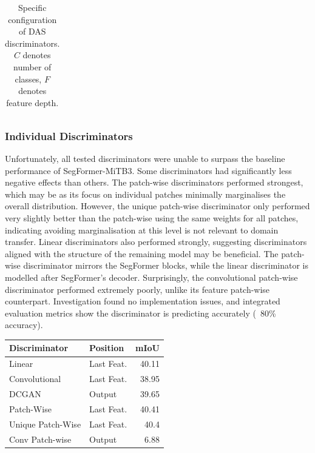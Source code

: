 \documentclass[a4paper,12pt]{report}
\begin{document}
\begin{table}[]
{\begin{tabular}{|l|l|}
        \end{tabular}
    }
    \caption{Specific configuration of DAS discriminators. $C$ denotes number of classes, $F$ denotes feature depth.}
    \label{tab:das-disc-configurations}
\end{table}

\subsubsection{Individual Discriminators}
Unfortunately, all tested discriminators were unable to surpass the baseline performance of SegFormer-MiTB3. Some discriminators had significantly less negative effects than others. The patch-wise discriminators performed strongest, which may be as its focus on individual patches minimally marginalises the overall distribution. However, the unique patch-wise discriminator only performed very slightly better than the patch-wise using the same weights for all patches, indicating avoiding marginalisation at this level is not relevant to domain transfer. Linear discriminators also performed strongly, suggesting discriminators aligned with the structure of the remaining model may be beneficial. The patch-wise discriminator mirrors the SegFormer blocks, while the linear discriminator is modelled after SegFormer's decoder. Surprisingly, the convolutional patch-wise discriminator performed extremely poorly, unlike its feature patch-wise counterpart. Investigation found no implementation issues, and integrated evaluation metrics show the discriminator is predicting accurately (~80\% accuracy).

\begin{table}[h]
    \centering
    \begin{tabular}{|l|l|r|}
        \hline
        Discriminator     & Position   & \multicolumn{1}{l|}{mIoU} \\ \hline
        Linear            & Last Feat. & 40.11                     \\ \hline
        Convolutional     & Last Feat. & 38.95                     \\ \hline
        DCGAN             & Output     & 39.65                     \\ \hline
        Patch-Wise        & Last Feat. & 40.41                     \\ \hline
        Unique Patch-Wise & Last Feat. & 40.4                      \\ \hline
        Conv Patch-wise   & Output     & 6.88                      \\ \hline
    \end{tabular}
\end{table}
\end{document}
